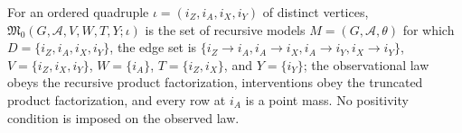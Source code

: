 For an ordered quadruple \(\iota=(i_Z,i_A,i_X,i_Y)\) of distinct
vertices, \(\mathfrak M_0(G,\mathcal A,V,W,T,Y;\iota)\) is the set of
recursive models \(M=(G,\mathcal A,\theta)\) for which
\(D=\{i_Z,i_A,i_X,i_Y\}\), the edge set is
\(\{i_Z\to i_A,i_A\to i_X,i_A\to i_Y,i_X\to i_Y\}\),
\(V=\{i_Z,i_X,i_Y\}\), \(W=\{i_A\}\),
\(T=\{i_Z,i_X\}\), and \(Y=\{i_Y\}\); the observational law obeys the
recursive product factorization, interventions obey the truncated product
factorization, and every row at \(i_A\) is a point mass.  No positivity
condition is imposed on the observed law.